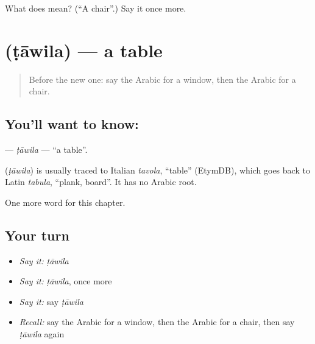 \begin{tcolorbox}[breakable,colback=teal!4,colframe=teal!35!black,title={Before you move on}]
What does  mean? (\textquotedblleft{}A chair\textquotedblright{}.) Say it once more.
\end{tcolorbox}
\section[\texorpdfstring{\ar{طاولة} (ṭāwila)}{طاولة (ṭāwila)}]{ (ṭāwila) — a table}

\label{lesson:AR-C70-tawila}



\begin{quote}
Before the new one: say the Arabic for a window, then the Arabic for a chair.
\end{quote}

\subsection*{You'll want to know: }
\textbf{} — \emph{ṭāwila} — \textquotedblleft{}a table\textquotedblright{}.

\begin{cousinweb}
\textbf{} (\emph{ṭāwila}) is usually traced to Italian \emph{tavola}, \textquotedblleft{}table\textquotedblright{} (EtymDB), which goes back to Latin \emph{tabula}, \textquotedblleft{}plank, board\textquotedblright{}. It has no Arabic root.
\end{cousinweb}

\begin{grammarlens}[title={What you've built}]
One more word for this chapter.
\end{grammarlens}

\subsection*{Your turn}
\begin{itemize}
\raggedright
  \item \emph{Say it:} \emph{ṭāwila}
  \item \emph{Say it:} \emph{ṭāwila}, once more
  \item \emph{Say it:} say \emph{ṭāwila}
  \item \emph{Recall:} say the Arabic for a window, then the Arabic for a chair, then say \emph{ṭāwila} again
\end{itemize}

